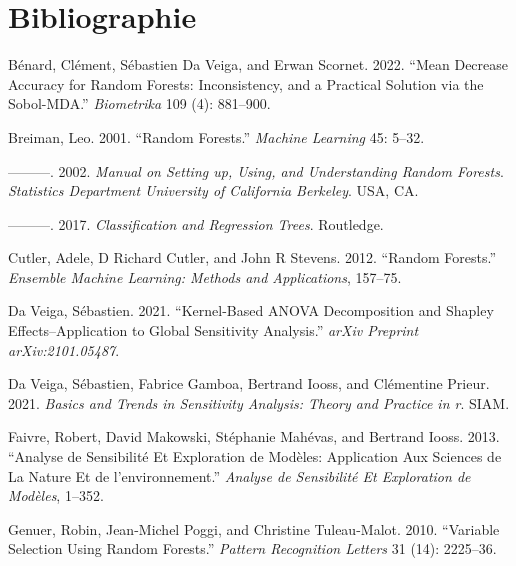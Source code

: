 \documentclass[
]{article}
\newlength{\cslhangindent}
\newlength{\cslentryspacingunit} %
\newenvironment{CSLReferences}[2] %
 {%
  \setlength{\parindent}{0pt}
  \ifodd #1
  \let\oldpar\par
  \def\par{\hangindent=\cslhangindent\oldpar}
  \fi
  \setlength{\parskip}{#2\cslentryspacingunit}
 }%
 {}
\begin{document}
\hypertarget{bibliographie}{%
\section*{Bibliographie}\label{bibliographie}}

\hypertarget{refs}{}
\begin{CSLReferences}{1}{0}
\leavevmode{}%
Bénard, Clément, Sébastien Da Veiga, and Erwan Scornet. 2022. {``Mean
Decrease Accuracy for Random Forests: Inconsistency, and a Practical
Solution via the Sobol-MDA.''} \emph{Biometrika} 109 (4): 881--900.

\leavevmode{}%
Breiman, Leo. 2001. {``Random Forests.''} \emph{Machine Learning} 45:
5--32.

\leavevmode{}%
---------. 2002. \emph{Manual on Setting up, Using, and Understanding
Random Forests}. \emph{Statistics Department University of California
Berkeley}. USA, CA.

\leavevmode{}%
---------. 2017. \emph{Classification and Regression Trees}. Routledge.

\leavevmode{}%
Cutler, Adele, D Richard Cutler, and John R Stevens. 2012. {``Random
Forests.''} \emph{Ensemble Machine Learning: Methods and Applications},
157--75.

\leavevmode{}%
Da Veiga, Sébastien. 2021. {``Kernel-Based ANOVA Decomposition and
Shapley Effects--Application to Global Sensitivity Analysis.''}
\emph{arXiv Preprint arXiv:2101.05487}.

\leavevmode{}%
Da Veiga, Sébastien, Fabrice Gamboa, Bertrand Iooss, and Clémentine
Prieur. 2021. \emph{Basics and Trends in Sensitivity Analysis: Theory
and Practice in r}. SIAM.

\leavevmode{}%
Faivre, Robert, David Makowski, Stéphanie Mahévas, and Bertrand Iooss.
2013. {``Analyse de Sensibilit{é} Et Exploration de Mod{è}les:
Application Aux Sciences de La Nature Et de l'environnement.''}
\emph{Analyse de Sensibilit{é} Et Exploration de Mod{è}les}, 1--352.

\leavevmode{}%
Genuer, Robin, Jean-Michel Poggi, and Christine Tuleau-Malot. 2010.
{``Variable Selection Using Random Forests.''} \emph{Pattern Recognition
Letters} 31 (14): 2225--36.


\end{CSLReferences}
\end{document}
